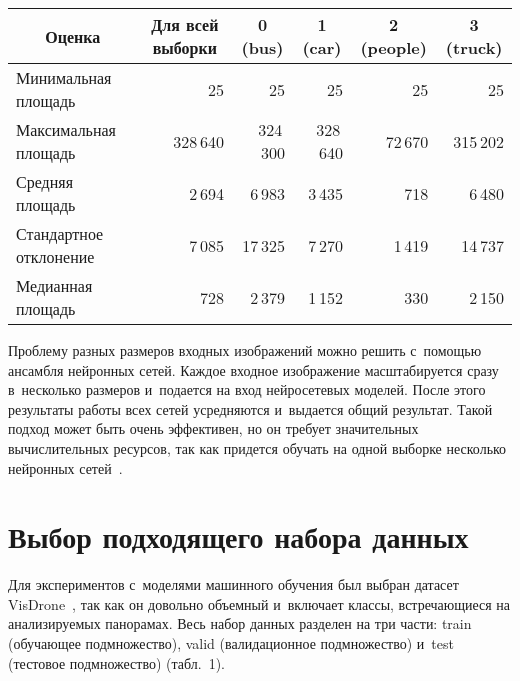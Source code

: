 \begin{multicols}{2}
\setcounter{table}{2}
\begin{table*}[b]\small %
\vspace*{-12pt}
\begin{center}
\vspace*{2ex}

\begin{tabular}{|l|r|r|r|r|r|}
\hline
    \multicolumn{1}{|c|}{Оценка}&\multicolumn{1}{c|}{Для всей выборки}&\multicolumn{1}{c|}{0 (bus)}& 
\multicolumn{1}{c|}{1 (car)}& \multicolumn{1}{c|}{2 (people)}& \multicolumn{1}{c|}{3 
(truck)}\\
  \hline
   Минимальная площадь&25\hphantom{10mm}&25&25&25&25\\
   Максимальная площадь&328\,640\hphantom{10mm}&324\,300&328\,640&72\,670&315\,202\\
   Средняя площадь&2\,694\hphantom{10mm}&6\,983&3\,435&718&6\,480\\
Стандартное отклонение&7\,085\hphantom{10mm}&17\,325&7\,270&1\,419&14\,737\\
   Медианная площадь&728\hphantom{10mm}&2\,379&1\,152&330&2\,150\\
  \hline
  \end{tabular}
  \end{center}
  \end{table*}
  
  Проблему разных размеров входных изображений можно решить с~по\-мощью 
ан\-самб\-ля нейронных сетей. Каж\-дое входное изображение масштабируется 
сразу в~несколько размеров и~подается на вход нейросетевых моделей. После 
этого результаты работы всех сетей усредняются и~выдается общий результат. 
Такой подход может быть очень эффективен, но он требует значительных 
вы\-чис\-ли\-тель\-ных ресурсов, так как придется \mbox{обучать} на одной выборке 
несколько нейронных сетей~\cite{7-ark}.

\vspace*{-6pt}

\section{Выбор подходящего набора данных}

  Для экспериментов с~моделями машинного обуче\-ния был выбран датасет 
VisDrone~\cite{8-ark}, так как он довольно объемный и~включает классы, 
встречающиеся на ана\-ли\-зи\-ру\-емых панорамах. Весь набор данных разделен 
на три части: train (обучающее подмножество), valid (валидационное 
подмножество) и~test (тес\-то\-вое под\-мно\-же\-ст\-во) (табл.~1). 


\end{multicols}
